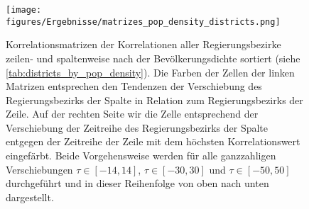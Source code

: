 \begin{figure}[H]
    \centering
    \texttt{[image: figures/Ergebnisse/matrizes\_pop\_density\_districts.png]}
    \caption{Korrelationsmatrizen der Korrelationen aller Regierungsbezirke zeilen- und spaltenweise nach der Bevölkerungsdichte sortiert (siehe \autoref{tab:districts_by_pop_density}). Die Farben der Zellen der linken Matrizen entsprechen den Tendenzen der Verschiebung des Regierungsbezirks der Spalte in Relation zum Regierungsbezirks der Zeile.
    Auf der rechten Seite wir die Zelle entsprechend der Verschiebung der Zeitreihe des Regierungsbezirks der Spalte entgegen der Zeitreihe der Zeile mit dem höchsten Korrelationswert eingefärbt. Beide Vorgehensweise werden für alle ganzzahligen Verschiebungen $\tau\in[-14,14]$,  $\tau\in[-30,30]$ und  $\tau\in[-50,50]$ durchgeführt und in dieser Reihenfolge von oben nach unten dargestellt.}
    \label{fig:matrizes_pop_density_districts}
\end{figure}

